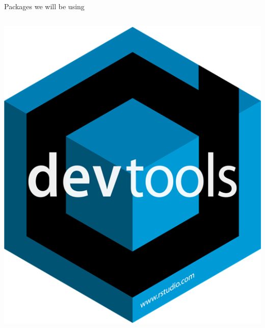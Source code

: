 \documentclass[11pt,a4paper]{beamer}
\begin{document}
\begin{frame}{Packages we will be using}

\begin{columns}

\begin{column}{0.20\textwidth}
\begin{center}
\includegraphics[width=1\textwidth]{devtools}

\end{center}
\end{column}




\end{columns}
\end{frame}
\end{document}
